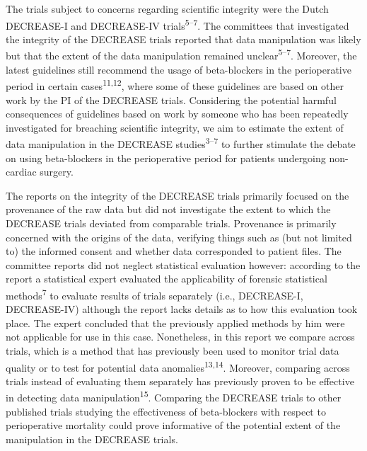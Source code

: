 \documentclass[]{article}
\begin{document}
The trials subject to concerns regarding scientific integrity were the
Dutch DECREASE-I and DECREASE-IV trials\textsuperscript{5--7}. The
committees that investigated the integrity of the DECREASE trials
reported that data manipulation was likely but that the extent of the
data manipulation remained unclear\textsuperscript{5--7}. Moreover, the
latest guidelines still recommend the usage of beta-blockers in the
perioperative period in certain cases\textsuperscript{11,12}, where some
of these guidelines are based on other work by the PI of the DECREASE
trials. Considering the potential harmful consequences of guidelines
based on work by someone who has been repeatedly investigated for
breaching scientific integrity, we aim to estimate the extent of data
manipulation in the DECREASE studies\textsuperscript{3--7} to further
stimulate the debate on using beta-blockers in the perioperative period
for patients undergoing non-cardiac surgery.

The reports on the integrity of the DECREASE trials primarily focused on
the provenance of the raw data but did not investigate the extent to
which the DECREASE trials deviated from comparable trials. Provenance is
primarily concerned with the origins of the data, verifying things such
as (but not limited to) the informed consent and whether data
corresponded to patient files. The committee reports did not neglect
statistical evaluation however: according to the report a statistical
expert evaluated the applicability of forensic statistical
methods\textsuperscript{7} to evaluate results of trials separately
(i.e., DECREASE-I, DECREASE-IV) although the report lacks details as to
how this evaluation took place. The expert concluded that the previously
applied methods by him were not applicable for use in this case.
Nonetheless, in this report we compare across trials, which is a method
that has previously been used to monitor trial data quality or to test
for potential data anomalies\textsuperscript{13,14}. Moreover, comparing
across trials instead of evaluating them separately has previously
proven to be effective in detecting data
manipulation\textsuperscript{15}. Comparing the DECREASE trials to other
published trials studying the effectiveness of beta-blockers with
respect to perioperative mortality could prove informative of the
potential extent of the manipulation in the DECREASE trials.
\end{document}
